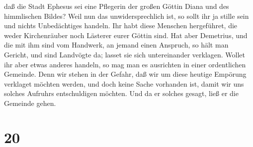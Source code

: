 daß die Stadt Ephesus sei eine Pflegerin der großen Göttin Diana und des
himmlischen Bildes?  Weil nun das unwidersprechlich ist, so
sollt ihr ja stille sein und nichts Unbedächtiges handeln. 
Ihr habt diese Menschen hergeführet, die weder Kirchenräuber noch
Lästerer eurer Göttin sind.  Hat aber Demetrius, und die
mit ihm sind vom Handwerk, an jemand einen Anspruch, so hält man
Gericht, und sind Landvögte da; lasset sie sich untereinander verklagen.
 Wollet ihr aber etwas anderes handeln, so mag man es
ausrichten in einer ordentlichen Gemeinde.  Denn wir stehen
in der Gefahr, daß wir um diese heutige Empörung verklaget möchten
werden, und doch keine Sache vorhanden ist, damit wir uns solches
Aufruhrs entschuldigen möchten. Und da er solches gesagt, ließ er die
Gemeinde gehen.

\hypertarget{section-19}{%
\section{20}\label{section-19}}

